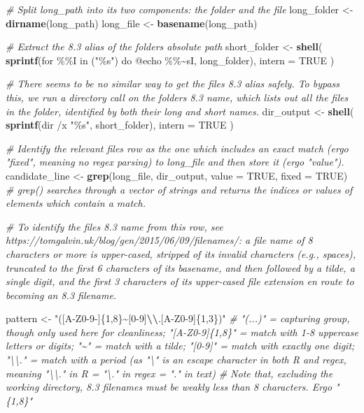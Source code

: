 \documentclass[
]{article}
\newenvironment{Shaded}{\begin{snugshade}}{\end{snugshade}}
\newcommand{\AttributeTok}[1]{\textcolor[rgb]{0.13,0.29,0.53}{#1}}
\newcommand{\CommentTok}[1]{\textcolor[rgb]{0.56,0.35,0.01}{\textit{#1}}}
\newcommand{\ConstantTok}[1]{\textcolor[rgb]{0.56,0.35,0.01}{#1}}
\newcommand{\FunctionTok}[1]{\textcolor[rgb]{0.13,0.29,0.53}{\textbf{#1}}}
\newcommand{\NormalTok}[1]{#1}
\newcommand{\OtherTok}[1]{\textcolor[rgb]{0.56,0.35,0.01}{#1}}
\newcommand{\SpecialCharTok}[1]{\textcolor[rgb]{0.81,0.36,0.00}{\textbf{#1}}}
\newcommand{\StringTok}[1]{\textcolor[rgb]{0.31,0.60,0.02}{#1}}
\begin{document}
\begin{Shaded}
\begin{Highlighting}[]
  \CommentTok{\# Split long\_path into its two components: the folder and the file}
\NormalTok{  long\_folder }\OtherTok{\textless{}{-}} \FunctionTok{dirname}\NormalTok{(long\_path)}
\NormalTok{  long\_file }\OtherTok{\textless{}{-}} \FunctionTok{basename}\NormalTok{(long\_path)}
  
  \CommentTok{\# Extract the 8.3 alias of the folder\textquotesingle{}s absolute path}
\NormalTok{  short\_folder }\OtherTok{\textless{}{-}} \FunctionTok{shell}\NormalTok{(}
    \FunctionTok{sprintf}\NormalTok{(}\StringTok{\textquotesingle{}for \%\%I in ("\%s") do @echo \%\%\textasciitilde{}sI\textquotesingle{}}\NormalTok{, long\_folder), }
    \AttributeTok{intern =} \ConstantTok{TRUE}
\NormalTok{    )}
  
  \CommentTok{\# There seems to be no similar way to get the file\textquotesingle{}s 8.3 alias safely. To bypass this, we run a directory call on the folder\textquotesingle{}s 8.3 name, which lists out all the files in the folder, identified by both their long and short names.}
\NormalTok{  dir\_output }\OtherTok{\textless{}{-}} \FunctionTok{shell}\NormalTok{(}
    \FunctionTok{sprintf}\NormalTok{(}\StringTok{\textquotesingle{}dir /x "\%s"\textquotesingle{}}\NormalTok{, short\_folder),}
    \AttributeTok{intern =} \ConstantTok{TRUE}
\NormalTok{  )}
  
  \CommentTok{\# Identify the relevant file\textquotesingle{}s row as the one which includes an exact match (ergo "fixed", meaning no regex parsing) to long\_file and then store it (ergo "value"). }
\NormalTok{  candidate\_line }\OtherTok{\textless{}{-}} \FunctionTok{grep}\NormalTok{(long\_file, dir\_output, }\AttributeTok{value =} \ConstantTok{TRUE}\NormalTok{, }\AttributeTok{fixed =} \ConstantTok{TRUE}\NormalTok{) }\CommentTok{\# grep() searches through a vector of strings and returns the indices or values of elements which contain a match.}

  
  
  \CommentTok{\# To identify the file\textquotesingle{}s 8.3 name from this row, see https://tomgalvin.uk/blog/gen/2015/06/09/filenames/: a file name of 8 characters or more is upper{-}cased, stripped of its invalid characters (e.g., spaces), truncated to the first 6 characters of its basename, and then followed by a tilde, a single digit, and the first 3 characters of its upper{-}cased file extension en route to becoming an 8.3 filename.}
  
\NormalTok{  pattern }\OtherTok{\textless{}{-}} \StringTok{"([A{-}Z0{-}9{-}]\{1,8\}\textasciitilde{}[0{-}9]}\SpecialCharTok{\textbackslash{}\textbackslash{}}\StringTok{.[A{-}Z0{-}9]\{1,3\})"} \CommentTok{\# "(...)" = capturing group, though only used here for cleanliness; "[A{-}Z0{-}9]\{1,8\}" = match with 1{-}8 uppercase letters or digits; "\textasciitilde{}" = match with a tilde; "[0{-}9]" = match with exactly one digit; "\textbackslash{}\textbackslash{}." = match with a period (as "\textbackslash{}" is an escape character in both R and regex, meaning "\textbackslash{}\textbackslash{}." in R = "\textbackslash{}." in regex = "." in text)}
  \CommentTok{\# Note that, excluding the working directory, 8.3 filenames must be weakly less than 8 characters. Ergo "\{1,8\}"}
  

\end{Highlighting}
\end{Shaded}
\end{document}
